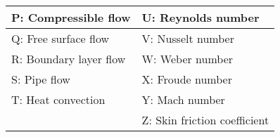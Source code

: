 \begin{tabular}{|l|l|}
\hline
P: Compressible flow & U: Reynolds number \\
\hline
Q: Free surface flow & V: Nusselt number \\
\hline
R: Boundary layer flow & W: Weber number \\
\hline
S: Pipe flow & X: Froude number \\
\hline
T: Heat convection & Y: Mach number \\
\hline
 & Z: Skin friction coefficient \\
\hline
\end{tabular}